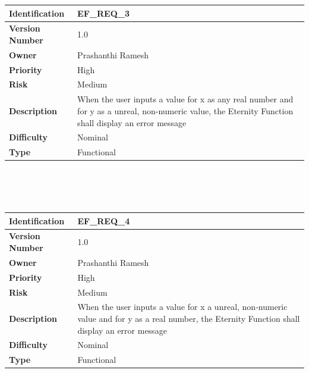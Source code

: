\documentclass[11pt, english]{report}
\begin{document}
\setlength{\tabcolsep}{18pt}
\renewcommand{\arraystretch}{1.5}
\begin{tabular}{ |p{2.2cm}|p{9.8cm}| }
\hline
\textbf{Identification} &  EF\_REQ\_3 \\ \hline 
\textbf{Version Number} & 1.0 \\ \hline 
\textbf{Owner} & Prashanthi Ramesh  \\ \hline
\textbf{Priority} & High  \\ \hline
\textbf{Risk} & Medium  \\ \hline
\textbf{Description} & When the user inputs a value for x as any real number and for y as a unreal, non-numeric value, the Eternity Function shall display an error message\\ \hline
\textbf{Difficulty} & Nominal  \\ \hline
\textbf{Type} & Functional \\ 
\hline
\end{tabular} \\ \\ \\

\setlength{\tabcolsep}{18pt}
\renewcommand{\arraystretch}{1.5}
\begin{tabular}{ |p{2.2cm}|p{9.8cm}| }
\hline
\textbf{Identification} &  EF\_REQ\_4 \\ \hline 
\textbf{Version Number} & 1.0 \\ \hline 
\textbf{Owner} & Prashanthi Ramesh  \\ \hline
\textbf{Priority} & High  \\ \hline
\textbf{Risk} & Medium  \\ \hline
\textbf{Description} & When the user inputs a value for x a unreal, non-numeric value and for y as a real number, the Eternity Function shall display an error message\\ \hline
\textbf{Difficulty} & Nominal  \\ \hline
\textbf{Type} & Functional \\ 
\hline
\end{tabular} \\ \\ \\
\end{document}
